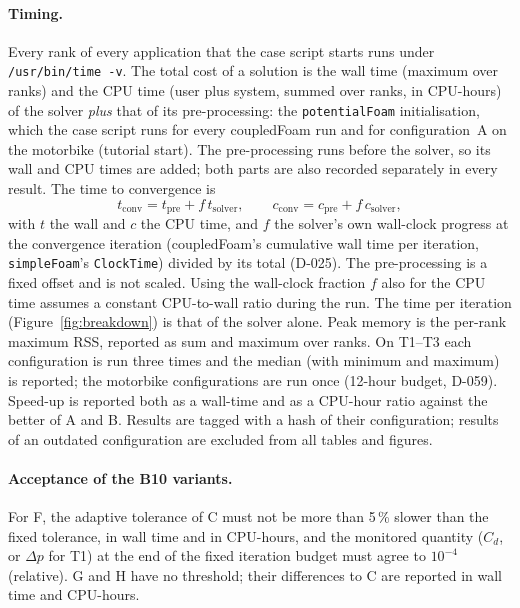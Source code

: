 \documentclass[11pt,a4paper]{article}
\newcommand{\code}[1]{\texttt{#1}}
\begin{document}
\paragraph{Timing.} Every rank of every application that the case script
starts runs under \code{/usr/bin/time -v}. The total cost of a solution is
the wall time (maximum over ranks) and the CPU time (user plus system,
summed over ranks, in CPU-hours) of the solver \emph{plus} that of its
pre-processing: the \code{potentialFoam} initialisation, which the case
script runs for every coupledFoam run and for configuration~A on the
motorbike (tutorial start). The
pre-processing runs before the solver, so its wall and CPU times are added;
both parts are also recorded separately in every result. The time to
convergence is
\begin{equation}
  t_{\mathrm{conv}} = t_{\mathrm{pre}} + f\,t_{\mathrm{solver}},\qquad
  c_{\mathrm{conv}} = c_{\mathrm{pre}} + f\,c_{\mathrm{solver}},
\end{equation}
with $t$ the wall and $c$ the CPU time, and $f$ the solver's own wall-clock
progress at the convergence iteration (coupledFoam's cumulative wall time per
iteration, \code{simpleFoam}'s \code{ClockTime}) divided by its total
(D-025). The pre-processing is a fixed offset and is not scaled. Using the
wall-clock fraction $f$ also for the CPU time assumes a constant CPU-to-wall
ratio during the run. The time per iteration (Figure~\ref{fig:breakdown}) is
that of the solver alone. Peak memory is the per-rank maximum RSS, reported
as sum and maximum over ranks. On T1--T3 each configuration is run three
times and the median (with minimum and maximum) is reported; the motorbike
configurations are run once (12-hour budget, D-059). Speed-up is reported both as
a wall-time and as a CPU-hour ratio against the better of A and B. Results
are tagged with a hash of their configuration; results of an outdated
configuration are excluded from all tables and figures.

\paragraph{Acceptance of the B10 variants.} For F, the adaptive tolerance of
C must not be more than 5\,\% slower than the fixed tolerance, in wall time
and in CPU-hours, and the monitored quantity ($C_d$, or $\Delta p$ for T1)
at the end of the fixed iteration budget must agree to $10^{-4}$ (relative).
G and H have no threshold; their differences to C are reported in wall
time and CPU-hours.
\end{document}
